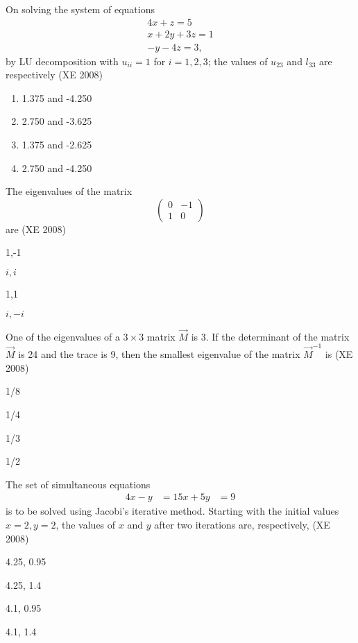 \item  On solving the system of equations
\begin{align*}
4x+z =5\\
x+2y+3z =1\\
-y-4z=3,
\end{align*}
by LU decomposition with $u_{ii} =1$ for $i =1,2,3$; the values of $u_{23}$ and $l_{33}$ are respectively
(XE 2008)
\begin{enumerate}
\item  1.375 and -4.250
\item  2.750 and -3.625
\item  1.375 and -2.625
\item 2.750 and -4.250
\end{enumerate}


\item The eigenvalues of the matrix $$\begin{pmatrix}0&-1\\1&0\end{pmatrix}$$ are
(XE 2008)
\begin{enumerate}
\begin{multicols}{4}
\item 1,-1          
\item $i,i$
\item 1,1    
\item $i,-i$
\end{multicols}
\end{enumerate}

\item One of the eigenvalues of a $3\times 3$ matrix $\vec{M}$ is 3. If the determinant of the matrix $\vec{M}$ is 24 and the trace is 9, then the smallest eigenvalue of the matrix $\vec{M}^{-1}$ is
(XE 2008)
\begin{enumerate}
\begin{multicols}{4}
\item 1/8 
\item 1/4 
\item 1/3 
\item 1/2
\end{multicols}
\end{enumerate}
\item The set of simultaneous equations 
	\begin{align*}4x-y&=15 
x+5y&=9\end{align*} 
is to be solved using Jacobi's iterative method. Starting with the initial values $x = 2, y =2$, the values of $x$ and $y$ after two iterations are, respectively,
(XE 2008)
\begin{enumerate}
\begin{multicols}{4}
\item  4.25, 0.95
\item  4.25, 1.4
\item  4.1, 0.95
\item 4.1, 1.4
\end{multicols}
\end{enumerate}

